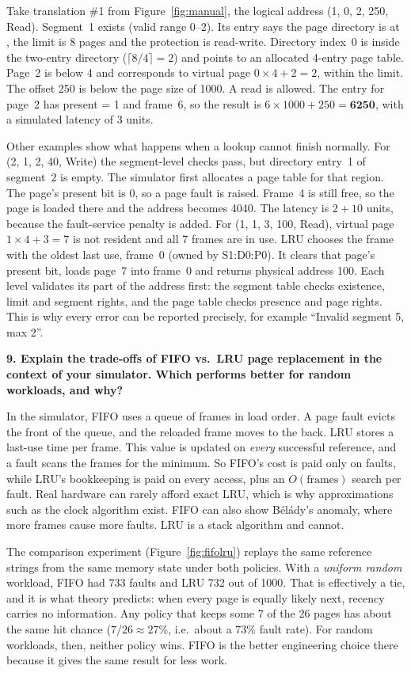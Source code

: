 \documentclass[11pt]{article}
\newcommand{\code}[1]{\texttt{\detokenize{#1}}}
\newcommand{\question}[1]{\par\medskip\noindent\textbf{#1}\par\smallskip}
\begin{document}
Take translation \#1 from Figure~\ref{fig:manual}, the logical address (1, 0, 2, 250, Read).
Segment~1 exists (valid range 0--2). Its entry says the page directory is at \code{0x2000}, the
limit is 8 pages and the protection is read-write. Directory index~0 is inside the two-entry
directory ($\lceil 8/4\rceil = 2$) and points to an allocated 4-entry page table. Page~2 is below
4 and corresponds to virtual page $0\times4+2 = 2$, within the limit. The offset 250 is below the page
size of 1000. A read is allowed. The entry for page~2 has present = 1 and frame~6, so the result is
$6\times1000+250 = \mathbf{6250}$, with a simulated latency of 3 units.

Other examples show what happens when a lookup cannot finish normally. For (2, 1, 2, 40, Write) the
segment-level checks pass, but directory entry~1 of segment~2 is empty. The simulator first
allocates a page table for that region. The page's present bit is 0, so a page fault is raised. Frame~4 is
still free, so the page is loaded there and the address becomes 4040. The latency is $2 + 10$ units, because
the fault-service penalty is added. For (1, 1, 3, 100, Read), virtual page $1\times4+3 = 7$
is not resident and all 7 frames are in use. LRU chooses the frame with the oldest last use,
frame~0 (owned by S1:D0:P0). It clears that page's present bit, loads page~7 into frame~0 and
returns physical address 100. Each level validates its part of the address first: the segment
table checks existence, limit and segment rights, and the page table checks presence and page rights.
This is why every error can be reported precisely, for example ``Invalid segment 5, max 2''.

\question{9. Explain the trade-offs of FIFO vs.\ LRU page replacement in the context of your simulator. Which performs better for random workloads, and why?}
In the simulator, FIFO uses a queue of frames in load order. A page fault evicts the front of the
queue, and the reloaded frame moves to the back. LRU stores a last-use time per frame. This value
is updated on \emph{every} successful reference, and a fault scans the frames for the minimum. So
FIFO's cost is paid only on faults, while LRU's bookkeeping is paid on every access, plus an
$O(\text{frames})$ search per fault. Real hardware can rarely afford exact LRU, which is why
approximations such as the clock algorithm exist. FIFO can also show Bélády's anomaly, where more frames
cause more faults. LRU is a stack algorithm and cannot.

The comparison experiment (Figure~\ref{fig:fifolru}) replays the same reference strings from the
same memory state under both policies. With a \emph{uniform random} workload, FIFO had 733 faults
and LRU 732 out of 1000. That is effectively a tie, and it is what theory predicts: when every page is
equally likely next, recency carries no information. Any policy that keeps some 7 of the 26
pages has about the same hit chance ($7/26 \approx 27\%$, i.e.\ about a 73\% fault rate). For random
workloads, then, neither policy wins. FIFO is the better engineering choice there because it gives the
same result for less work.
\end{document}
